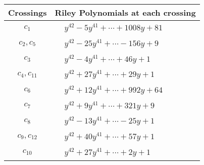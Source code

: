 \documentclass[1p]{elsarticle_modified}
\theoremstyle{definition}
\begin{document}
\begin{tabular}{m{50pt}|m{274pt}}
Crossings & \hspace{64pt}Riley Polynomials at each crossing \\
\hline $$\begin{aligned}c_{1}\end{aligned}$$&$\begin{aligned}
&y^{42}-5 y^{41}+\cdots+1008 y+81
\end{aligned}$\\
\hline $$\begin{aligned}c_{2},c_{5}\end{aligned}$$&$\begin{aligned}
&y^{42}-25 y^{41}+\cdots-156 y+9
\end{aligned}$\\
\hline $$\begin{aligned}c_{3}\end{aligned}$$&$\begin{aligned}
&y^{42}-4 y^{41}+\cdots+46 y+1
\end{aligned}$\\
\hline $$\begin{aligned}c_{4},c_{11}\end{aligned}$$&$\begin{aligned}
&y^{42}+27 y^{41}+\cdots+29 y+1
\end{aligned}$\\
\hline $$\begin{aligned}c_{6}\end{aligned}$$&$\begin{aligned}
&y^{42}+12 y^{41}+\cdots+992 y+64
\end{aligned}$\\
\hline $$\begin{aligned}c_{7}\end{aligned}$$&$\begin{aligned}
&y^{42}+9 y^{41}+\cdots+321 y+9
\end{aligned}$\\
\hline $$\begin{aligned}c_{8}\end{aligned}$$&$\begin{aligned}
&y^{42}-13 y^{41}+\cdots-25 y+1
\end{aligned}$\\
\hline $$\begin{aligned}c_{9},c_{12}\end{aligned}$$&$\begin{aligned}
&y^{42}+40 y^{41}+\cdots+57 y+1
\end{aligned}$\\
\hline $$\begin{aligned}c_{10}\end{aligned}$$&$\begin{aligned}
&y^{42}+27 y^{41}+\cdots+2 y+1
\end{aligned}$\\
\hline
\end{tabular}\\~\\
\end{document}
